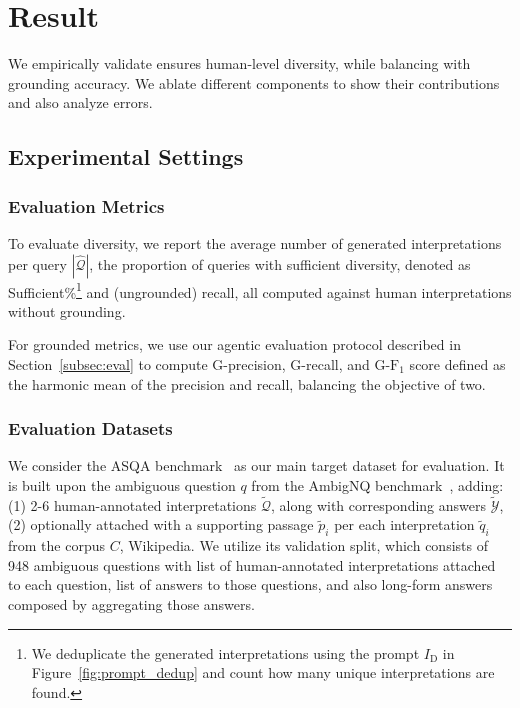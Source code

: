 

\section{Result}

We empirically validate \ours ensures human-level diversity, while balancing with grounding accuracy.
We ablate different components to 
show their contributions and also analyze errors.


\subsection{Experimental Settings}

\subsubsection{Evaluation Metrics}\label{sec:met}


To evaluate diversity,
we report the average number of generated interpretations per query $|\hat{\mathcal{Q}}|$,
the proportion of queries with 
sufficient diversity, denoted as Sufficient\%\footnote{We deduplicate the generated interpretations using the prompt $I_{\textrm{D}}$ in Figure~\ref{fig:prompt_dedup} and count how many unique interpretations are found.}
and (ungrounded) recall, all computed against human interpretations without grounding.

For grounded metrics, we use
our agentic evaluation protocol described in Section~\ref{subsec:eval} to compute G-precision, G-recall, and G-$\textrm{F}_1$ score defined as the harmonic mean of the precision and recall, balancing the objective of two.



\subsubsection{Evaluation Datasets}
We consider the ASQA benchmark~\citep{stelmakh-etal-2022-asqa} as our main target dataset for evaluation.
It is built upon the ambiguous question $q$ from the AmbigNQ benchmark~\citep{min-etal-2020-ambigqa}, adding: (1) 2-6 human-annotated interpretations $\tilde{\mathcal{Q}}$, 
along with corresponding answers $\tilde{\mathcal{Y}}$,
 (2)  optionally attached with a supporting passage $\tilde{p}_i$ per each interpretation $\tilde{q}_i$ from the corpus $C$, Wikipedia.
We utilize its validation split, which consists of 948 ambiguous questions with list of human-annotated interpretations attached to each question, list of answers to those questions, and also long-form answers composed by aggregating those answers.


